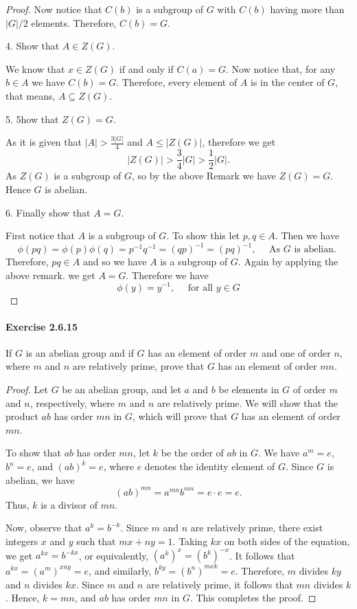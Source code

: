 \documentclass{article}
\begin{document}
\begin{proof}
Now notice that $C(b)$ is a subgroup of $G$ with $C(b)$ having more than $|G| / 2$ elements. Therefore, $C(b)=G$.

4. Show that $A \in Z(G)$.

We know that $x \in Z(G)$ if and only if $C(a)=G$. Now notice that, for any $b \in A$ we have $C(b)=G$. Therefore, every element of $A$ is in the center of $G$, that means, $A \subseteq Z(G)$.

5. 5how that $Z(G)=G$.

As it is given that $|A|>\frac{3|G|}{4}$ and $A \leq|Z(G)|$, therefore we get
$$
|Z(G)|>\frac{3}{4}|G|>\frac{1}{2}|G| .
$$
As $Z(G)$ is a subgroup of $G$, so by the above Remark we have $Z(G)=G$. Hence $G$ is abelian.

6. Finally show that $A=G$.

First notice that $A$ is a subgroup of $G$. To show this let $p, q \in A$. Then we have
$$
\phi(p q)=\phi(p) \phi(q)=p^{-1} q^{-1}=(q p)^{-1}=(p q)^{-1}, \quad \text { As } G \text { is abelian. }
$$
Therefore, $p q \in A$ and so we have $A$ is a subgroup of $G$. Again by applying the above remark. we get $A=G$. Therefore we have
$$
\phi(y)=y^{-1}, \quad \text { for all } y \in G
$$

\end{proof}



\paragraph{Exercise 2.6.15} If $G$ is an abelian group and if $G$ has an element of order $m$ and one of order $n$, where $m$ and $n$ are relatively prime, prove that $G$ has an element of order $mn$.
\begin{proof}
Let $G$ be an abelian group, and let $a$ and $b$ be elements in $G$ of order $m$ and $n$, respectively, where $m$ and $n$ are relatively prime. We will show that the product $ab$ has order $mn$ in $G$, which will prove that $G$ has an element of order $mn$.

To show that $ab$ has order $mn$, let $k$ be the order of $ab$ in $G$. We have $a^m = e$, $b^n = e$, and $(ab)^k = e$, where $e$ denotes the identity element of $G$. Since $G$ is abelian, we have
$$(ab)^{mn} = a^{mn}b^{mn} = e \cdot e = e.$$
Thus, $k$ is a divisor of $mn$.

Now, observe that $a^k = b^{-k}$. Since $m$ and $n$ are relatively prime, there exist integers $x$ and $y$ such that $mx + ny = 1$. Taking $kx$ on both sides of the equation, we get $a^{kx} = b^{-kx}$, or equivalently, $(a^k)^x = (b^k)^{-x}$. It follows that $a^{kx} = (a^m)^{xny} = e$, and similarly, $b^{ky} = (b^n)^{mxk} = e$. Therefore, $m$ divides $ky$ and $n$ divides $kx$. Since $m$ and $n$ are relatively prime, it follows that $mn$ divides $k$. Hence, $k = mn$, and $ab$ has order $mn$ in $G$. This completes the proof.
\end{proof}
\end{document}
